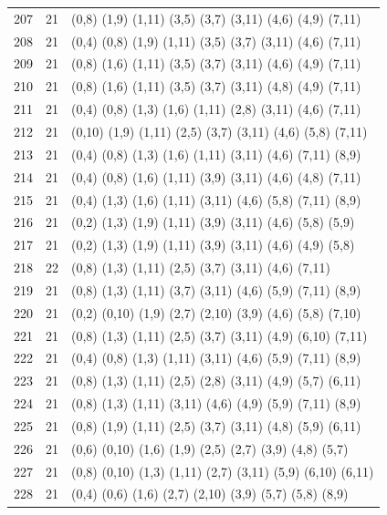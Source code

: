 \begin{appendix}
{\begin{longtable}{lll}
207& 21 & (0,8)   (1,9)  (1,11) (3,5)   (3,7)   (3,11)  (4,6)   (4,9)   (7,11)\\
208& 21 & (0,4)   (0,8)  (1,9)  (1,11)  (3,5)   (3,7)   (3,11)  (4,6)   (7,11)\\
209& 21 & (0,8)   (1,6)  (1,11) (3,5)   (3,7)   (3,11)  (4,6)   (4,9)   (7,11)\\
210& 21 & (0,8)   (1,6)  (1,11) (3,5)   (3,7)   (3,11)  (4,8)   (4,9)   (7,11)\\
211& 21 & (0,4)   (0,8)  (1,3)  (1,6)   (1,11)  (2,8)   (3,11)  (4,6)   (7,11)\\
212& 21 & (0,10)  (1,9)  (1,11) (2,5)   (3,7)   (3,11)  (4,6)   (5,8)   (7,11)\\
213& 21 & (0,4)   (0,8)  (1,3)  (1,6)   (1,11)  (3,11)  (4,6)   (7,11)  (8,9)\\
214& 21 & (0,4)   (0,8)  (1,6)  (1,11)  (3,9)   (3,11)  (4,6)   (4,8)   (7,11)\\
215& 21 & (0,4)   (1,3)  (1,6)  (1,11)  (3,11)  (4,6)   (5,8)   (7,11)  (8,9)\\
216& 21 & (0,2)   (1,3)  (1,9)  (1,11)  (3,9)   (3,11)  (4,6)   (5,8)   (5,9)\\
217& 21 & (0,2)   (1,3)  (1,9)  (1,11)  (3,9)   (3,11)  (4,6)   (4,9)   (5,8)\\
218& 22 & (0,8)   (1,3)  (1,11) (2,5)   (3,7)   (3,11)  (4,6)   (7,11)  \\
219& 21 & (0,8)   (1,3)  (1,11) (3,7)   (3,11)  (4,6)   (5,9)   (7,11)  (8,9)\\
220& 21 & (0,2)   (0,10) (1,9)  (2,7)   (2,10)  (3,9)   (4,6)   (5,8)   (7,10)\\
221& 21 & (0,8)   (1,3)  (1,11) (2,5)   (3,7)   (3,11)  (4,9)   (6,10)  (7,11)\\
222& 21 & (0,4)   (0,8)  (1,3)  (1,11)  (3,11)  (4,6)   (5,9)   (7,11)  (8,9)\\
223& 21 & (0,8)   (1,3)  (1,11) (2,5)   (2,8)   (3,11)  (4,9)   (5,7)   (6,11)\\
224& 21 & (0,8)   (1,3)  (1,11) (3,11)  (4,6)   (4,9)   (5,9)   (7,11)  (8,9)\\
225& 21 & (0,8)   (1,9)  (1,11) (2,5)   (3,7)   (3,11)  (4,8)   (5,9)   (6,11)\\
226& 21 & (0,6)   (0,10) (1,6)  (1,9)   (2,5)   (2,7)   (3,9)   (4,8)   (5,7)\\
227& 21 & (0,8)   (0,10) (1,3)  (1,11)  (2,7)   (3,11)  (5,9)   (6,10)  (6,11)\\
228& 21 & (0,4)   (0,6)  (1,6)  (2,7)   (2,10)  (3,9)   (5,7)   (5,8)   (8,9)\\

\end{longtable}}
\end{appendix}
